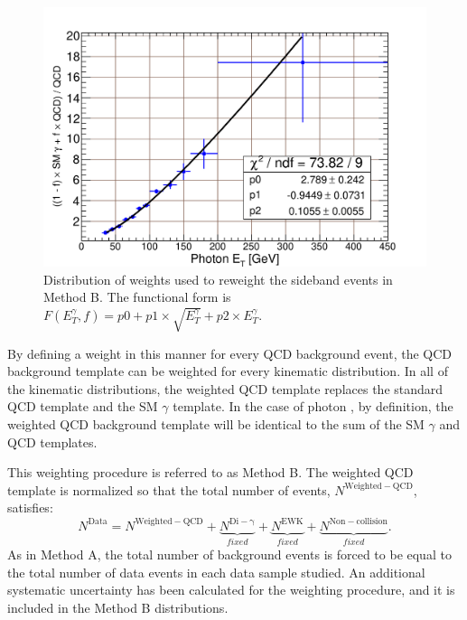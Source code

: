 \begin{figure}[htb!]
 \centering
 \includegraphics[scale=0.5,keepaspectratio=true]{./MtdB_Sideband_Weights.pdf}
 \caption{Distribution of weights used to reweight the sideband events in Method B. The functional form is $F(E_{T}^{\gamma},f)= p0+p1\times\sqrt{E_{T}^{\gamma}}+p2\times E_{T}^{\gamma}$.}
 \label{fig:MtdB_NominalWgts}
\end{figure}

By defining a weight in this manner for every QCD background event, the QCD background template can be weighted for every kinematic distribution. In all of the kinematic distributions, the weighted QCD template replaces the standard QCD template and the SM $\gamma$ template. In the case of photon \et, by definition, the weighted QCD background template will be identical to the sum of the SM $\gamma$ and QCD templates.

This weighting procedure is referred to as Method B. The weighted QCD template is normalized so that the total number of events, $N^\mathrm{Weighted-QCD}$, satisfies:
\begin{equation}
 N^\mathrm{Data} = N^\mathrm{Weighted-QCD}+\underbrace{N^\mathrm{Di-\gamma}}_{fixed}+\underbrace{N^\mathrm{EWK}}_{fixed}+\underbrace{N^\mathrm{Non-collision}}_{fixed}.
\label{eqa:MtdBnorm}
\end{equation}
As in Method A, the total number of background events is forced to be equal to the total number of data events in each data sample studied. An additional systematic uncertainty has been calculated for the weighting procedure, and it is included in the Method B distributions.

